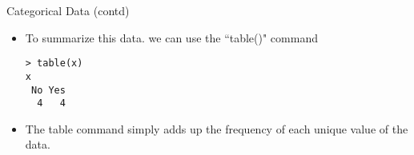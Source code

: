 \documentclass[pdf,default,slideColor,colorBG]{prosper}
\begin{document}

\begin{slide}{Categorical Data (contd)}
\begin{itemize}
\item To summarize this data. we can use the ``table()" command

\begin{verbatim}
> table(x)
x
 No Yes
  4   4
\end{verbatim}

\item The table command simply adds up the frequency of each unique value of the data.
\end{itemize}
\end{slide}
\end{document}
